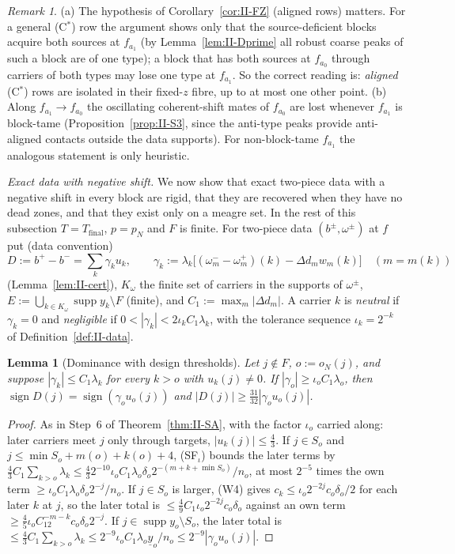 \documentclass[10pt]{amsart}
\newtheorem{lemma}[theorem]{Lemma}
\theoremstyle{definition}
\theoremstyle{remark}
\newtheorem{remark}[theorem]{Remark}
\newcommand{\supp}{\operatorname{supp}}
\newcommand{\sgn}{\operatorname{sign}}
\begin{document}
\begin{remark}\label{rem:II-FZ}
(a) The hypothesis of Corollary~\ref{cor:II-FZ} (aligned rows) matters.  For a
general (C$^*$) row the argument shows only that the source-deficient blocks
acquire both sources at $f_{a_1}$ (by Lemma~\ref{lem:II-Dprime} all robust coarse
peaks of such a block are of one type); a block that has both sources at
$f_{a_0}$ through carriers of both types may lose one type at $f_{a_1}$.  So the
correct reading is: \emph{aligned} (C$^*$) rows are isolated in their fixed-$z$
fibre, up to at most one other point.
(b) Along $f_{a_1}\to f_{a_0}$ the oscillating coherent-shift mates of $f_{a_0}$
are lost whenever $f_{a_1}$ is block-tame (Proposition~\ref{prop:II-S3}, since
the anti-type peaks provide anti-aligned contacts outside the data
supports).  For non-block-tame $f_{a_1}$ the analogous statement is only
heuristic.
\end{remark}

\smallskip\noindent\emph{Exact data with negative shift.}  We now show that
exact two-piece data with a negative shift in every block are rigid, that
they are recovered when they have no dead zones, and that they exist only on
a meagre set.  In the rest of this subsection $T=T_{\mathrm{final}}$, $p=p_N$
and $F$ is finite.  For two-piece data $(b^\pm,\omega^\pm)$ at $f$ put (data
convention)
\[
 D:=b^+-b^-=\sum_k\gamma_ku_k,\qquad\gamma_k:=\lambda_k\big[(\omega^-_m-\omega^+_m)(k)
 -\Delta d_mw_m(k)\big]\quad(m=m(k))
\]
(Lemma~\ref{lem:II-cert}), $K_\omega$ the finite set of carriers in the supports
of $\omega^\pm$, $E:=\bigcup_{k\in K_\omega}\supp y_k\setminus F$ (finite), and
$C_1:=\max_m|\Delta d_m|$.  A carrier $k$ is \emph{neutral} if $\gamma_k=0$ and
\emph{negligible} if $0<|\gamma_k|<2\iota_kC_1\lambda_k$, with the tolerance
sequence $\iota_k=2^{-k}$ of Definition~\ref{def:II-data}.

\begin{lemma}[Dominance with design thresholds]\label{lem:II-dom}
Let $j\notin F$, $o:=o_N(j)$, and suppose $|\gamma_k|\le C_1\lambda_k$ for every
$k>o$ with $u_k(j)\ne0$.  If $|\gamma_o|\ge\iota_oC_1\lambda_o$, then $\sgn D(j)=
\sgn(\gamma_ou_o(j))$ and $|D(j)|\ge\frac{31}{32}|\gamma_ou_o(j)|$.
\end{lemma}

\begin{proof}
As in Step~6 of Theorem~\ref{thm:II-SA}, with the factor $\iota_o$ carried along:
later carriers meet $j$ only through targets, $|u_k(j)|\le\frac43$.  If $j\in
S_o$ and $j\le\min S_o+m(o)+k(o)+4$, (SF$_\iota$) bounds the later terms by
$\frac43C_1\sum_{k>o}\lambda_k\le\frac432^{-10}\iota_oC_1\lambda_o\delta_o2^{-(m+k+
\min S_o)}/n_o$, at most $2^{-5}$ times the own term $\ge\iota_oC_1\lambda_o\delta_o2^{-j}/
n_o$.  If $j\in S_o$ is larger, (W4) gives $c_k\le\iota_o2^{-2j}c_o\delta_o/2$ for
each later $k$ at $j$, so the later total is $\le\frac49C_1\iota_o2^{-2j}c_o\delta_o$
against an own term $\ge\frac45\iota_oC_12^{-m-k}c_o\delta_o2^{-j}$.  If $j\in\supp y_o
\setminus S_o$, the later total is $\le\frac43C_1\sum_{k>o}\lambda_k\le2^{-9}\iota_oC_1
\lambda_o\underline y_o/n_o\le2^{-9}|\gamma_ou_o(j)|$.
\end{proof}
\end{document}
